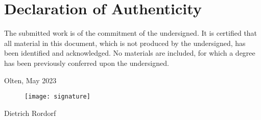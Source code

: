 \vspace*{3cm}

\section*{Declaration of Authenticity}

The submitted work is of the commitment of the undersigned. It is certified that all material
in this document, which is not produced by the undersigned, has been identified and acknowledged.
No materials are included, for which a degree has been previously conferred upon the undersigned.

\vspace*{1cm} 
\noindent Olten, May 2023

\begin{figure}[h!]
    \texttt{[image: signature]}
\end{figure}
\noindent Dietrich Rordorf





